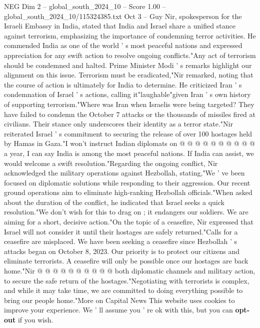 \begin{textsample}{NEG Dim 2 – global\_south\_2024\_10 – Score 1.00 – global\_south\_2024\_10/115324385.txt}  \label{ex:f2_neg_317}
Oct 3 -- Guy Nir, spokesperson for the Israeli Embassy in India, stated that India and Israel share a unified stance against terrorism, emphasizing the importance of condemning terror activities.
He commended India as one of the world ' s most peaceful nations and expressed appreciation for any swift action to resolve ongoing conflicts."Any act of terrorism should be condemned and halted.
Prime Minister Modi ' s remarks highlight our alignment on this issue.
Terrorism must be eradicated,"Nir remarked, noting that the course of action is ultimately for India to determine.
He criticized Iran ' s condemnation of Israel ' s actions, calling it"laughable"given Iran ' s own history of supporting terrorism."Where was Iran when Israelis were being targeted?
They have failed to condemn the October 7 attacks or the thousands of missiles fired at civilians.
Their stance only underscores their identity as a terror state."Nir reiterated Israel ' s commitment to securing the release of over 100 hostages held by Hamas in Gaza."I won't instruct Indian diplomats on @ @ @ @ @ @ @ @ @ @ a year, I can say India is among the most peaceful nations.
If India can assist, we would welcome a swift resolution."Regarding the ongoing conflict, Nir acknowledged the military operations against Hezbollah, stating,"We ' ve been focused on diplomatic solutions while responding to their aggression.
Our recent ground operations aim to eliminate high-ranking Hezbollah officials."When asked about the duration of the conflict, he indicated that Israel seeks a quick resolution."We don't wish for this to drag on ; it endangers our soldiers.
We are aiming for a short, decisive action."On the topic of a ceasefire, Nir expressed that Israel will not consider it until their hostages are safely returned."Calls for a ceasefire are misplaced.
We have been seeking a ceasefire since Hezbollah ' s attacks began on October 8, 2023.
Our priority is to protect our citizens and eliminate terrorists.
A ceasefire will only be possible once our hostages are back home."Nir @ @ @ @ @ @ @ @ @ @ both diplomatic channels and military action, to secure the safe return of the hostages."Negotiating with terrorists is complex, and while it may take time, we are committed to doing everything possible to bring our people home."More on Capital News This website uses cookies to improve your experience.
We ' ll assume you ' re ok with this, but you can \textbf{opt-out} if you wish.

\end{textsample}
